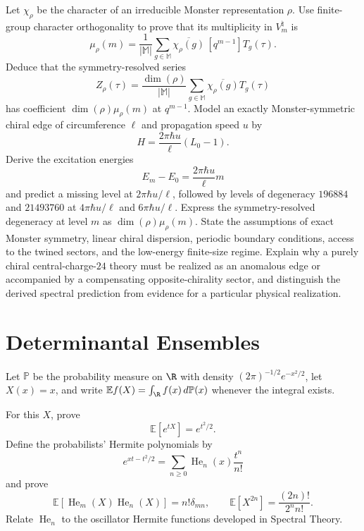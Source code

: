 \begin{exercise}
Let $\chi_\rho$ be the character of an irreducible Monster representation
$\rho$.  Use finite-group character orthogonality to prove that its
multiplicity in $V_m^\natural$ is
\[
\mu_\rho(m)=\frac1{|\mathbb M|}\sum_{g\in\mathbb M}
\overline{\chi_\rho(g)}\,[q^{m-1}]T_g(\tau).
\]
Deduce that the symmetry-resolved series
\[
Z_\rho(\tau)=\frac{\dim(\rho)}{|\mathbb M|}
\sum_{g\in\mathbb M}\overline{\chi_\rho(g)}T_g(\tau)
\]
has coefficient $\dim(\rho)\mu_\rho(m)$ at $q^{m-1}$.
Model an exactly Monster-symmetric chiral edge of circumference $\ell$ and
propagation speed $u$ by
\[
H=\frac{2\pi\hbar u}{\ell}(L_0-1).
\]
Derive the excitation energies
\[
E_m-E_0=\frac{2\pi\hbar u}{\ell}m
\]
and predict a missing level at $2\pi\hbar u/\ell$, followed by levels of
degeneracy $196884$ and $21493760$ at $4\pi\hbar u/\ell$ and
$6\pi\hbar u/\ell$.  Express the symmetry-resolved degeneracy at level $m$
as $\dim(\rho)\mu_\rho(m)$.  State the assumptions of exact Monster symmetry,
linear chiral dispersion, periodic boundary conditions, access to the twined
sectors, and the low-energy finite-size regime.  Explain why a
purely chiral central-charge-$24$ theory must be realized as an anomalous edge
or accompanied by a compensating opposite-chirality sector, and distinguish
the derived spectral prediction from evidence for a particular physical
realization.
\end{exercise}

\section{Determinantal Ensembles}

\begin{exercise}
Let $\mathbb P$ be the probability measure on $\R$ with density
$(2\pi)^{-1/2}e^{-x^2/2}$, let $X(x)=x$, and write
$\mathbb Ef(X)=\int_\R f(x)\,d\mathbb P(x)$ whenever the integral exists.

For this $X$, prove
\[
\mathbb E[e^{tX}]=e^{t^2/2}.
\]
Define the probabilists' Hermite polynomials by
\[
e^{xt-t^2/2}
=\sum_{n\geq0}\operatorname{He}_n(x)\frac{t^n}{n!}
\]
and prove
\[
\mathbb E[\operatorname{He}_m(X)\operatorname{He}_n(X)]
=n!\delta_{mn},
\qquad
\mathbb E[X^{2n}]=\frac{(2n)!}{2^nn!}.
\]
Relate $\operatorname{He}_n$ to the oscillator Hermite functions developed
in Spectral Theory.
\end{exercise}

